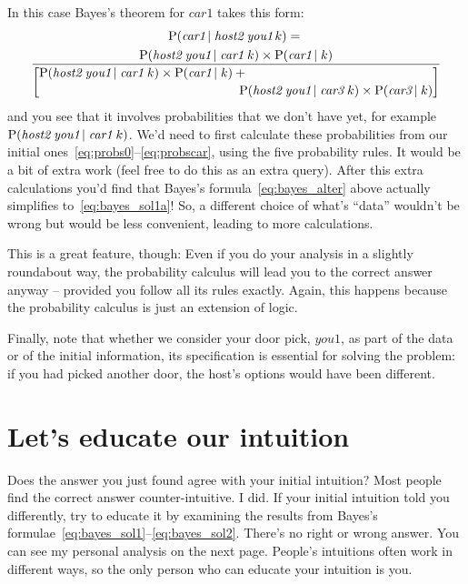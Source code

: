 \documentclass[\ifafour a4paper,12pt,\else a5paper,10pt,\fi%
onecolumn,oneside,article,%
british%
]{memoir}
\theoremstyle{remark}
\theoremstyle{innote}
\newcommand*{\p}{\mathrm{P}}%
\renewcommand*{\|}{\nonscript\,\vert\nonscript\;\mathopen{}}
\newcommand*{\cara}{\textit{car1}}
\newcommand*{\carc}{\textit{car3}}
\newcommand*{\hostb}{\textit{host2}}
\newcommand*{\youa}{\textit{you1}}
\begin{document}
In this case Bayes's theorem for $\cara$ takes this form:
\begin{multline}%
  \p(\cara\|\hostb\;\youa\,k) ={}\\[0\jot]
  \frac{
    \p(\hostb\;\youa\|\cara\;k) \times \p(\cara\| k)
  }{\left[ 
      \!\begin{multlined}[0.9\linewidth]
        \p(\hostb\;\youa\|\cara\;k) \times \p(\cara\| k)
        +{}\\ \p(\hostb\;\youa\|\carc\;k) \times \p(\carc\|k)
      \end{multlined} \right]
  }\label{eq:bayes_alter}
\end{multline}
and you see that it involves probabilities that we don't have yet, for
example $\p(\hostb\;\youa\|\cara\;k)$. We'd need to first calculate these
probabilities from our initial ones~\eqref{eq:probs0}--\eqref{eq:probscar},
using the five probability rules. It would be a bit of extra work (feel
free to do this as an extra query). After this extra calculations you'd
find that Bayes's formula~\eqref{eq:bayes_alter} above actually simplifies
to~\eqref{eq:bayes_sol1a}! So, a different choice of what's \enquote{data}
wouldn't be wrong but would be less convenient, leading to more
calculations.

This is a great feature, though: Even if you do your analysis in a slightly
roundabout way, the probability calculus will lead you to the correct
answer anyway -- provided you follow all its rules exactly. Again, this
happens because the probability calculus is just an extension of logic.

Finally, note that whether we consider your door pick, $\youa$, as part of
the data or of the initial information, its specification is essential for
solving the problem: if you had picked another door, the host's options
would have been different. 

\clearpage


\section{Let's educate our intuition}
\label{sec:intuition}



Does the answer you just found agree with your initial intuition? Most
people find the correct answer counter-intuitive. I did. If your initial
intuition told you differently, try to educate it by examining the results
from Bayes's formulae~\eqref{eq:bayes_sol1}--\eqref{eq:bayes_sol2}. There's
no right or wrong answer. You can see my personal analysis on the next
page. People's intuitions often work in different ways, so the only person
who can educate your intuition is you.
\end{document}
